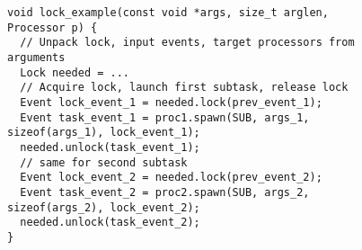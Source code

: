 \begin{figure}
\begin{lrbox}{\mylistingbox}
\begin{lstlisting}
void lock_example(const void *args, size_t arglen, Processor p) {
  // Unpack lock, input events, target processors from arguments
  Lock needed = ...
  // Acquire lock, launch first subtask, release lock
  Event lock_event_1 = needed.lock(prev_event_1);
  Event task_event_1 = proc1.spawn(SUB, args_1, sizeof(args_1), lock_event_1);
  needed.unlock(task_event_1);
  // same for second subtask
  Event lock_event_2 = needed.lock(prev_event_2);
  Event task_event_2 = proc2.spawn(SUB, args_2, sizeof(args_2), lock_event_2);
  needed.unlock(task_event_2);
}
\end{lstlisting}
\end{lrbox}
\subfigure{\usebox{\mylistingbox}}\\

\centering
{}
\end{figure}
